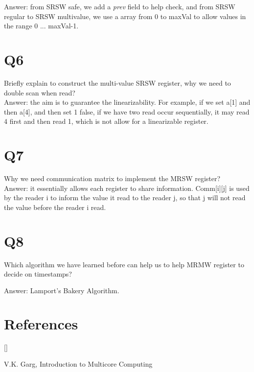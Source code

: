 \documentclass[twoside]{article}
\def\beginrefs{\begin{list}%
        {[\arabic{equation}]}{\usecounter{equation}
         \setlength{\leftmargin}{2.0truecm}\setlength{\labelsep}{0.4truecm}%
         \setlength{\labelwidth}{1.6truecm}}}
\def\endrefs{\end{list}}
\def\bibentry#1{\item[\hbox{[#1]}]}
\begin{document}
Answer: from SRSW safe, we add a \textit{prev} field to help check, and from SRSW regular to SRSW multivalue, we use a array from 0 to maxVal to allow values in the range 0 ... maxVal-1.

\section*{Q6}
Briefly explain to construct the multi-value SRSW register, why we need to double scan when read?\\

Answer: the aim is to guarantee the linearizability. For example, if we set a[1] and then a[4], and then set 1 false, if we have two read occur sequentially, it may read 4 first and then read 1, which is not allow for a linearizable register. 

\section*{Q7}
Why we need communication matrix to implement the MRSW register?\\

Answer: it essentially allows each register to share information. Comm[i][j] is used by the reader i to inform the value it read to the reader j, so that j will not read the value before the reader i read.

\section*{Q8}
Which algorithm we have learned before can help us to help MRMW register to decide on timestamps?

Answer: Lamport's Bakery Algorithm. 
\section*{References}
\beginrefs
\bibentry{1}{\sc V.K. Garg},  Introduction to Multicore Computing
\endrefs
\end{document}
